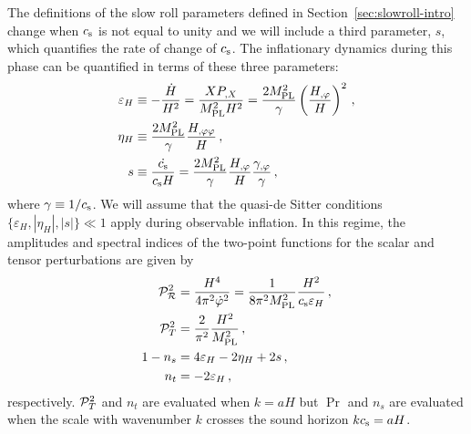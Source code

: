 The definitions of the slow roll parameters defined in
Section~\ref{sec:slowroll-intro} 
change when $c_\mathrm{s}$ is not equal to unity and we
will include a third parameter, $s$, which quantifies the rate of change of $c_\mathrm{s}$.
The inflationary dynamics during this phase can  
be quantified in terms of these three parameters: 
% 
\begin{align}
\label{eq:epsdefn-dbiintro}
\varepsilon_H &\equiv -\frac{\dot{H}}{H^2}
= \frac{XP_{,X}}{M_{\mathrm{PL}}^2H^2} 
= \frac{2M_{\mathrm{PL}}^2}{\gamma} \left( \frac{H_{,\varphi}}{H} \right)^2 \,,\\
\label{eq:defeta-dbiintro}
\eta_H &\equiv  \frac{2M_{\mathrm{PL}}^2}{\gamma}\frac{H_{,\varphi\varphi}}{H} \,,\\
\label{eq:defs-dbiintro}
s &\equiv \frac{\dot{c_\mathrm{s}}}{c_\mathrm{s} H} 
= \frac{2M_{\mathrm{PL}}^2}{\gamma} \frac{H_{,\varphi}}{H}\frac{\gamma_{,\varphi}}{\gamma}  \,,
\end{align}
% 
where $\gamma \equiv 1/c_\mathrm{s}$. 
We will assume that the quasi-de Sitter conditions 
$\{ \varepsilon_H, |\eta_H | , |s | \}  \ll 1$ apply during observable inflation. 
In this regime, the amplitudes and spectral indices of the two-point functions 
for the scalar and tensor perturbations are given by \cite{gm}
% 
\begin{align}
\label{eq:spectra-dbiintro}
\mathcal{P}_{\mathcal{R}}^2  &= \frac{H^4}{4\pi^2\dot{\varphi}^2} =\frac{1}{8 \pi^2 M_{\mathrm{PL}}^2}
\frac{H^2}{c_\mathrm{s} \varepsilon_H}\,,
\\
\mathcal{P}_T^2 &= \frac{2}{\pi^2} \frac{H^2}{M_{\mathrm{PL}}^2} \,,
\\
\label{indices}
1-n_s &= 4 \varepsilon_H -2\eta_H  +2s \,,
\\
 n_t &= -2\varepsilon_H  \,,
\end{align}
% 
respectively. $\mathcal{P}_T^2$ and $n_t$ are evaluated when $k=aH$ but $\Pr$ and $n_s$ are
evaluated 
when the scale with wavenumber $k$ crosses 
the sound horizon $k c_\mathrm{s} = aH$.  



